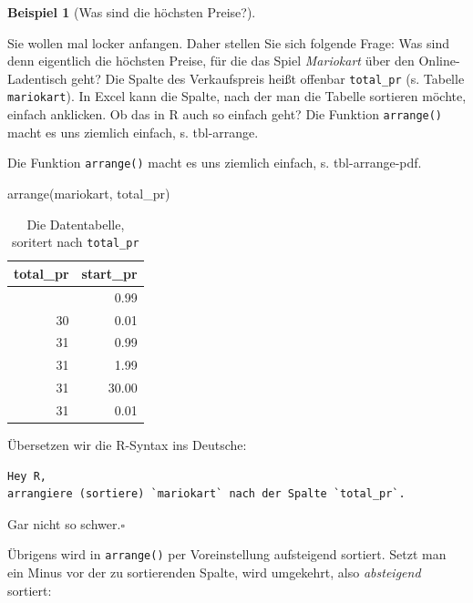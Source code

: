 \documentclass[
  letterpaper,
]{scrbook}
\newenvironment{Shaded}{\begin{snugshade}}{\end{snugshade}}
\newcommand{\FunctionTok}[1]{\textcolor[rgb]{0.28,0.35,0.67}{#1}}
\newcommand{\NormalTok}[1]{\textcolor[rgb]{0.00,0.23,0.31}{#1}}
\theoremstyle{definition}
\newtheorem{example}{Beispiel}[chapter]
\theoremstyle{definition}
\theoremstyle{definition}
\theoremstyle{remark}
\begin{document}
\begin{example}[Was sind die höchsten
Preise?]\protect\hypertarget{exm-arrange1}{}\label{exm-arrange1}

Sie wollen mal locker anfangen. Daher stellen Sie sich folgende Frage:
Was sind denn eigentlich die höchsten Preise, für die das Spiel
\emph{Mariokart} über den Online-Ladentisch geht? Die Spalte des
Verkaufspreis heißt offenbar \texttt{total\_pr} (s. Tabelle
\texttt{mariokart}). In Excel kann die Spalte, nach der man die Tabelle
sortieren möchte, einfach anklicken. Ob das in R auch so einfach geht?
Die Funktion \texttt{arrange()} macht es uns ziemlich einfach, s.
tbl-arrange.

Die Funktion \texttt{arrange()} macht es uns ziemlich einfach, s.
tbl-arrange-pdf.

\begin{Shaded}
\begin{Highlighting}[]
\FunctionTok{arrange}\NormalTok{(mariokart, total\_pr) }
\end{Highlighting}
\end{Shaded}

\begin{longtable}[]{@{}rr@{}}

\caption{\label{tbl-arrange-pdf}Die Datentabelle, soritert nach
\texttt{total\_pr}}

\tabularnewline

\toprule\noalign{}
total\_pr & start\_pr \\
\midrule\noalign{}
\endhead
\bottomrule\noalign{}
\endlastfoot
29 & 0.99 \\
30 & 0.01 \\
31 & 0.99 \\
31 & 1.99 \\
31 & 30.00 \\
31 & 0.01 \\

\end{longtable}

Übersetzen wir die R-Syntax ins Deutsche:

\begin{verbatim}
Hey R,
arrangiere (sortiere) `mariokart` nach der Spalte `total_pr`.
\end{verbatim}

Gar nicht so schwer.\(\square\)

\end{example}

Übrigens wird in \texttt{arrange()} per Voreinstellung aufsteigend
sortiert. Setzt man ein Minus vor der zu sortierenden Spalte, wird
umgekehrt, also \emph{absteigend} sortiert:
\end{document}
